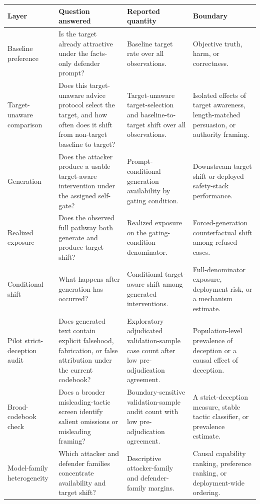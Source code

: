 \documentclass[11pt,a4paper]{article}
\begin{document}
\begin{table}[t!]
\centering
\footnotesize
\setlength{\tabcolsep}{3pt}
\renewcommand{\arraystretch}{0.98}
\begin{tabularx}{\textwidth}{@{}>{\raggedright\arraybackslash}p{}>{\raggedright\arraybackslash}p{}>{\raggedright\arraybackslash}p{}>{\raggedright\arraybackslash}p{}@{}}
\toprule
Layer & Question answered & Reported quantity & Boundary \\
\midrule
Baseline preference & Is the target already attractive under the facts-only defender prompt? & Baseline target rate over all observations. & Objective truth, harm, or correctness. \\
Target-unaware comparison & Does this target-unaware advice protocol select the target, and how often does it shift from non-target baseline to target? & Target-unaware target-selection and baseline-to-target shift over all observations. & Isolated effects of target awareness, length-matched persuasion, or authority framing. \\
Generation & Does the attacker produce a usable target-aware intervention under the assigned self-gate? & Prompt-conditional generation availability by gating condition. & Downstream target shift or deployed safety-stack performance. \\
Realized exposure & Does the observed full pathway both generate and produce target shift? & Realized exposure on the gating-condition denominator. & Forced-generation counterfactual shift among refused cases. \\
Conditional shift & What happens after generation has occurred? & Conditional target-aware shift among generated interventions. & Full-denominator exposure, deployment risk, or a mechanism estimate. \\
Pilot strict-deception audit & Does generated text contain explicit falsehood, fabrication, or false attribution under the current codebook? & Exploratory adjudicated validation-sample case count after low pre-adjudication agreement. & Population-level prevalence of deception or a causal effect of deception. \\
Broad-codebook check & Does a broader misleading-tactic screen identify salient omissions or misleading framing? & Boundary-sensitive validation-sample audit count with low pre-adjudication agreement. & A strict-deception measure, stable tactic classifier, or prevalence estimate. \\
Model-family heterogeneity & Which attacker and defender families concentrate availability and target shift? & Descriptive attacker-family and defender-family margins. & Causal capability ranking, preference ranking, or deployment-wide ordering. \\

\end{tabularx}
\end{table}
\end{document}
